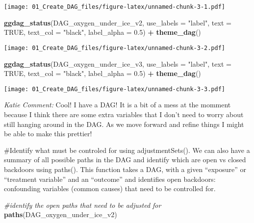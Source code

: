\documentclass[
]{article}
\newenvironment{Shaded}{\begin{snugshade}}{\end{snugshade}}
\newcommand{\AttributeTok}[1]{\textcolor[rgb]{0.13,0.29,0.53}{#1}}
\newcommand{\CommentTok}[1]{\textcolor[rgb]{0.56,0.35,0.01}{\textit{#1}}}
\newcommand{\ConstantTok}[1]{\textcolor[rgb]{0.56,0.35,0.01}{#1}}
\newcommand{\FloatTok}[1]{\textcolor[rgb]{0.00,0.00,0.81}{#1}}
\newcommand{\FunctionTok}[1]{\textcolor[rgb]{0.13,0.29,0.53}{\textbf{#1}}}
\newcommand{\NormalTok}[1]{#1}
\newcommand{\SpecialCharTok}[1]{\textcolor[rgb]{0.81,0.36,0.00}{\textbf{#1}}}
\newcommand{\StringTok}[1]{\textcolor[rgb]{0.31,0.60,0.02}{#1}}
\begin{document}
\texttt{[image: 01\_Create\_DAG\_files/figure-latex/unnamed-chunk-3-1.pdf]}

\begin{Shaded}
\begin{Highlighting}[]
\FunctionTok{ggdag\_status}\NormalTok{(DAG\_oxygen\_under\_ice\_v2,}
             \AttributeTok{use\_labels =} \StringTok{"label"}\NormalTok{,}
             \AttributeTok{text =} \ConstantTok{TRUE}\NormalTok{,}
              \AttributeTok{text\_col =} \StringTok{"black"}\NormalTok{,}
             \AttributeTok{label\_alpha =} \FloatTok{0.5}\NormalTok{) }\SpecialCharTok{+} \FunctionTok{theme\_dag}\NormalTok{()}
\end{Highlighting}
\end{Shaded}

\texttt{[image: 01\_Create\_DAG\_files/figure-latex/unnamed-chunk-3-2.pdf]}

\begin{Shaded}
\begin{Highlighting}[]
\FunctionTok{ggdag\_status}\NormalTok{(DAG\_oxygen\_under\_ice\_v3,}
             \AttributeTok{use\_labels =} \StringTok{"label"}\NormalTok{,}
             \AttributeTok{text =} \ConstantTok{TRUE}\NormalTok{,}
              \AttributeTok{text\_col =} \StringTok{"black"}\NormalTok{,}
             \AttributeTok{label\_alpha =} \FloatTok{0.5}\NormalTok{) }\SpecialCharTok{+} \FunctionTok{theme\_dag}\NormalTok{()}
\end{Highlighting}
\end{Shaded}

\texttt{[image: 01\_Create\_DAG\_files/figure-latex/unnamed-chunk-3-3.pdf]}

{ \emph{Katie Comment:} Cool! I have a DAG! It is a bit of a mess at the
momment because I think there are some extra variables that I don't need
to worry about still hanging around in the DAG. As we move forward and
refine things I might be able to make this prettier!\\
}

\#Identify what must be controled for using adjustmentSets(). We can
also have a summary of all possible paths in the DAG and identify which
are open vs closed backdoors using paths(). This function takes a DAG,
with a given ``exposure'' or ``treatment variable'' and an ``outcome''
and identifies open backdoors: confounding variables (common causes)
that need to be controlled for.

\begin{Shaded}
\begin{Highlighting}[]
\CommentTok{\#identify the open paths that need to be adjusted for }
\FunctionTok{paths}\NormalTok{(DAG\_oxygen\_under\_ice\_v2)}
\end{Highlighting}
\end{Shaded}
\end{document}
